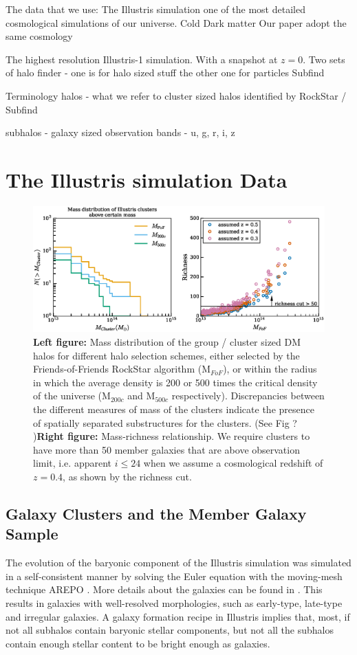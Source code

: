 \documentclass[usenatbib]{mn2e}
\begin{document}
The data that we use: The Illustris simulation 
one of the most detailed cosmological simulations of our universe. 
Cold Dark matter 
Our paper adopt the same cosmology

The highest resolution Illustris-1 simulation. 
With a snapshot at $z=0$. 
Two sets of halo finder - one is for halo sized stuff 
the other one for particles 
Subfind 


Terminology 
halos - what we refer to cluster sized halos identified by RockStar  / Subfind 

subhalos - galaxy sized  
observation bands - u, g, r, i, z


\section{The Illustris simulation Data} 
\begin{figure}
	\includegraphics[width=\linewidth]{./figures/finalized/clusterMassDist.eps}
	\caption{ {\bf Left figure:} Mass distribution of the group / cluster sized DM halos
		for different halo selection schemes, either selected by the
		Friends-of-Friends RockStar algorithm (M$_{FoF}$), or within the radius in
		which the average density is 200 or 500 times the critical density of the universe
		(M$_{200c}$ and M$_{500c}$ respectively). Discrepancies between the different
		measures of mass of the clusters indicate the presence of spatially
		separated substructures for the clusters. (See Fig ? ){\bf Right figure:} Mass-richness
	relationship. We require clusters to have more than 50 member galaxies that
	are above observation limit, i.e. apparent $i \leq 24$ when we assume a cosmological redshift
	of $z=0.4$, as shown by the richness cut. \label{fig:mass_richness}}
\end{figure}


\subsection{Galaxy Clusters and the Member Galaxy Sample}
The evolution of the baryonic component of the Illustris simulation was
simulated in a self-consistent manner by solving the Euler equation with the
moving-mesh technique AREPO \cite{Springel2010}. More details about the
galaxies can be found in \cite{Vogelsberger2014}.
This results in galaxies with well-resolved morphologies, such as early-type,
late-type and irregular galaxies.
A galaxy formation recipe in Illustris implies that,
most, if not all subhalos contain baryonic stellar components, but not all the
subhalos contain enough stellar content to be bright enough as galaxies. 
\end{document}
